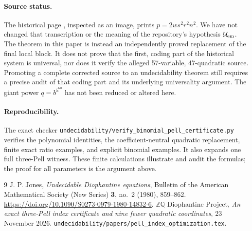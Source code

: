 \documentclass[11pt]{article}
\begin{document}
\paragraph{Source status.}
The historical page \cite[Theorem 3, p.~861]{Jones80}, inspected as
an image, prints \(p=2ws^2r^2n^2\).  We have not changed that
transcription or the meaning of the repository's hypothesis
\(\mathcal U_{\rm em}\).  The theorem in this paper is instead
an independently proved replacement of the final local block.
It does not prove that the first, coding part of the historical
system is universal, nor does it verify the alleged 57-variable,
47-quadratic source.  Promoting a complete corrected source to an
undecidability theorem still requires a precise audit of that coding
part and its underlying universality argument.  The giant power
\(q=b^{5^{60}}\) has not been reduced or altered here.

\paragraph{Reproducibility.}
The exact checker
\nolinkurl{undecidability/verify_binomial_pell_certificate.py}
verifies the polynomial identities, the coefficient-neutral
quadratic replacement, finite exact ratio examples, and explicit
binomial examples.  It also expands one full three-Pell witness.
These finite calculations illustrate and audit the formulas; the
proof for all parameters is the argument above.

\begin{thebibliography}{9}
J. P. Jones, \emph{Undecidable Diophantine equations},
Bulletin of the American Mathematical Society (New Series)
\textbf{3}, no.~2 (1980), 859--862.
\url{https://doi.org/10.1090/S0273-0979-1980-14832-6}.
\(\mathbb Z\mathbb Q\) Diophantine Project,
\emph{An exact three-Pell index certificate and nine fewer quadratic
coordinates}, 23 November 2026.
\nolinkurl{undecidability/papers/pell_index_optimization.tex}.
\end{thebibliography}
\end{document}
